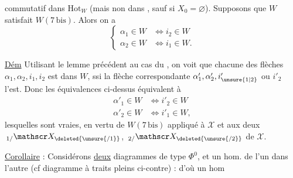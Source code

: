 commutatif dans $\mathrm{Hot}_{W}$ (mais non dans , sauf si $X_0=\varnothing$). Supposons que $W$ satisfait $W(7\,\mathrm{bis})$. Alors on a
\[
\left\{\begin{aligned}
\alpha_1\in W&\Longleftrightarrow i_2\in W\\
\alpha_2\in W&\Longleftrightarrow i_1\in W .
\end{aligned}\right.
\]

 \uline{Dém} Utilisant le lemme précédent au cas du , on voit que chacune des flèches $\alpha_1,\alpha_2,i_1,i_2$ est dans $W$, ssi la flèche correspondante $\alpha'_1,\alpha'_2,i'_{\unsure{1|2}}$ ou $i'_2$ l'est. Donc les équivalences ci-dessus équivalent à
\[
\begin{aligned}
\alpha'_1\in W&\Longleftrightarrow i'_2\in W\\
\alpha'_2\in W&\Longleftrightarrow i'_1\in W ,
\end{aligned}
\]
lesquelles sont vraies, en vertu de $W(7\,\mathrm{bis})$  appliqué  à $\mathscr X$ et aux deux \uline{} $\,{}_{1/}\mathscr X_{\deleted{\unsure{/1}}}$, $\,{}_{2/}\mathscr X_{\deleted{\unsure{/2}}}$ de $\mathscr X$.

\uline{Corollaire} : Considérons \uline{deux} diagrammes de type $\Phi^0$, et un hom.  de l'un dans l'autre (cf diagramme à traits pleins ci-contre) :
d'où un hom
